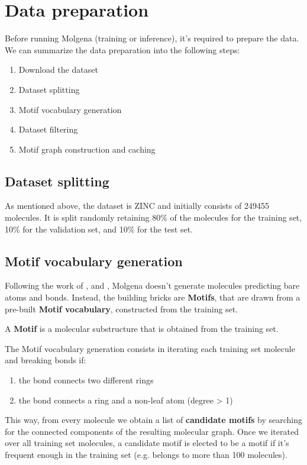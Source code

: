 \documentclass{article}
\begin{document}
\section{Data preparation}

Before running Molgena (training or inference), it's required to prepare the data.
We can summarize the data preparation into the following steps:

\begin{enumerate}
\item Download the dataset
\item Dataset splitting
\item Motif vocabulary generation
\item Dataset filtering
\item Motif graph construction and caching
\end{enumerate}

\subsection{Dataset splitting}

As mentioned above, the dataset is ZINC and initially consists of 249455 molecules.
It is split randomly retaining 80\% of the molecules for the training set, 10\% for the validation set, and 10\% for the test set.

\subsection{Motif vocabulary generation}

Following the work of \cite{jtvae2019}, \cite{hievae2020} and \cite{microsoft2024}, Molgena doesn't generate molecules predicting bare atoms and bonds.
Instead, the building bricks are \textbf{Motifs}, that are drawn from a pre-built \textbf{Motif vocabulary}, constructed from the training set.

A \textbf{Motif} is a molecular substructure that is obtained from the training set.

The Motif vocabulary generation consists in iterating each training set molecule and breaking bonds if:
\begin{enumerate}
\item the bond connects two different rings
\item the bond connects a ring and a non-leaf atom (degree > 1)
\end{enumerate}

This way, from every molecule we obtain a list of \textbf{candidate motifs} by searching for the connected components of the resulting molecular graph.
Once we iterated over all training set molecules, a candidate motif is elected to be a motif if it's frequent enough in
the training set (e.g. belongs to more than 100 molecules).
\end{document}
